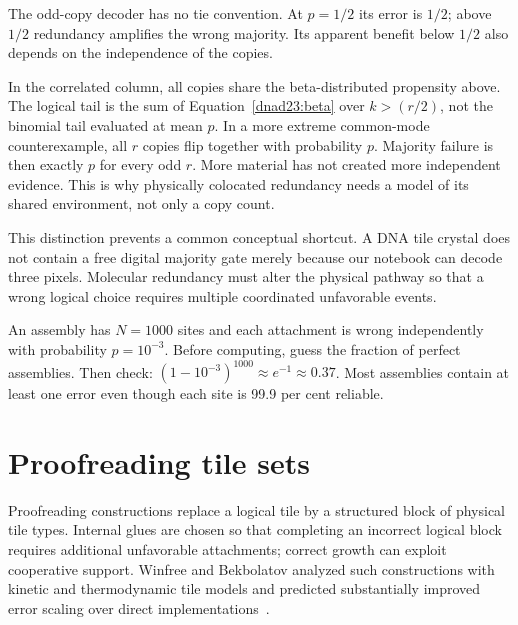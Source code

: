 The odd-copy decoder has no tie convention. At $p=1/2$ its error is $1/2$;
above $1/2$ redundancy amplifies the wrong majority. Its apparent benefit below
$1/2$ also depends on the independence of the copies.
\begin{center}\end{center}
In the correlated column, all copies share the beta-distributed propensity
above. The logical tail is the sum of Equation~\ref{dnad23:beta} over
$k>(r/2)$, not the binomial tail evaluated at mean $p$. In a more extreme
common-mode counterexample, all $r$ copies flip together with probability $p$.
Majority failure is then exactly $p$ for every odd $r$. More material has not
created more independent evidence. This is why physically colocated redundancy
needs a model of its shared environment, not only a copy count.


This distinction prevents a common conceptual shortcut. A DNA tile crystal does not
contain a free digital majority gate merely because our notebook can decode three
pixels. Molecular redundancy must alter the physical pathway so that a wrong logical
choice requires multiple coordinated unfavorable events.

\begin{TryThis}
An assembly has $N=1000$ sites and each attachment is wrong independently with
probability $p=10^{-3}$. Before computing, guess the fraction of perfect
assemblies. Then check: $(1-10^{-3})^{1000}\approx e^{-1}\approx0.37$. Most
assemblies contain at least one error even though each site is 99.9 per cent
reliable.
\end{TryThis}

\section{Proofreading tile sets}

Proofreading constructions replace a logical tile by a structured block of physical
tile types. Internal glues are chosen so that completing an incorrect logical block
requires additional unfavorable attachments; correct growth can exploit cooperative
support. Winfree and Bekbolatov analyzed such constructions with kinetic and
thermodynamic tile models and predicted substantially improved error scaling over
direct implementations~\cite{WinfreeBekbolatov2004}.

